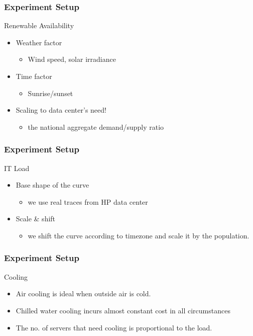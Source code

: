 \documentclass{beamer}
\begin{document}
%
%
\begin{frame}
\frametitle{Experiment Setup}
\begin{block}
{Renewable Availability}
\begin{itemize}
\item
Weather factor
	\begin{itemize}
	\item
	Wind speed, solar irradiance
	\end{itemize}
\item
Time factor
	\begin{itemize}
	\item
	Sunrise/sunset
	\end{itemize}
\item
Scaling to data center's need!
	\begin{itemize}
	\item
	the national aggregate demand/supply ratio
	\end{itemize}
\end{itemize}
\end{block}
\end{frame}
%
%
\begin{frame}
\frametitle{Experiment Setup}
\begin{block}
{IT Load}
\begin{itemize}
\item
Base shape of the curve
	\begin{itemize}
	\item
	we use real traces from HP data center
	\end{itemize}
\item
Scale \& shift
	\begin{itemize}
	\item
	we shift the curve according to timezone and scale it by the population.
	\end{itemize}
\end{itemize}
\end{block}
\end{frame}
%
%
\begin{frame}
\frametitle{Experiment Setup}
\begin{block}
{Cooling}
\begin{itemize}
\item
Air cooling is ideal when outside air is cold.
\item
Chilled water cooling incurs almost constant cost in all circumstances
\item
The no. of servers that need cooling is proportional to the load.
\end{itemize}
\end{block}
\end{frame}
\end{document}
